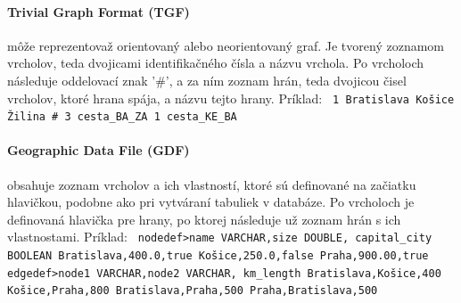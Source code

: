 \documentclass[12pt,twoside,slovak,a4paper]{article}
\begin{document}
\paragraph{Trivial Graph Format (TGF)} môže reprezentovaž orientovaný alebo neorientovaný graf. Je tvorený zoznamom vrcholov, teda dvojicami identifikačného čísla a názvu vrchola. Po vrcholoch následuje oddelovací znak '\#', a za ním zoznam hrán, teda dvojicou čisel vrcholov, ktoré hrana spája, a názvu tejto hrany.
\newline \newline 
Príklad: \newline	
\texttt{
1 Bratislava  Košice  Žilina \newline
\#  3 cesta\_BA\_ZA  1 cesta\_KE\_BA \newline
}
	
	\paragraph{Geographic Data File (GDF)} obsahuje zoznam vrcholov a ich vlastností,  ktoré sú definované na začiatku hlavičkou, podobne ako pri vytváraní tabuliek v databáze. Po vrcholoch je definovaná hlavička pre hrany, po ktorej následuje už zoznam hrán s ich vlastnostami. 
\newline \newline 
Príklad: \newline
\texttt{
nodedef>name VARCHAR,size DOUBLE, capital\_city BOOLEAN \newline
Bratislava,400.0,true \newline
Košice,250.0,false \newline
Praha,900.00,true \newline
edgedef>node1 VARCHAR,node2 VARCHAR, km\_length \newline
Bratislava,Košice,400 \newline
Košice,Praha,800 \newline
Bratislava,Praha,500 \newline
Praha,Bratislava,500 \newline
}
\end{document}
